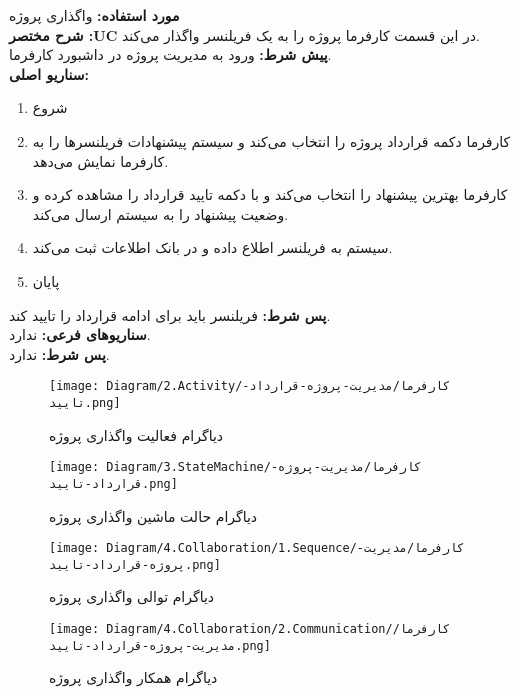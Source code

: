 \textbf{مورد استفاده:}
واگذاری پروژه
\\
\textbf{شرح مختصر :UC}
در این قسمت کارفرما پروژه را به یک فریلنسر واگذار می‌کند.
\\
\textbf{پيش شرط:}
ورود به مدیریت پروژه در داشبورد کارفرما.
\\
\textbf{سناريو اصلی:}
\begin{enumerate}
\item
شروع
\item
کارفرما دکمه قرارداد پروژه را انتخاب می‌کند و سیستم پیشنهادات فریلنسرها را به کارفرما نمایش می‌دهد.
\item
کارفرما بهترین پیشنهاد را انتخاب می‌کند و با دکمه تایید قرارداد را مشاهده کرده و وضعیت پیشنهاد را به سیستم ارسال می‌کند.
\item
سیستم به فریلنسر اطلاع داده و در بانک اطلاعات ثبت می‌کند.
\item
پایان
\end{enumerate}

\noindent
\textbf{پس شرط:}
فریلنسر باید برای ادامه قرارداد را تایید کند.
\\
\textbf{سناريوهای فرعی:}
ندارد.
\\
\textbf{پس شرط:}
ندارد.



\begin{figure}[H]
	\centering
	\texttt{[image: Diagram/2.Activity/کارفرما/مدیریت-پروژه-قرارداد-تایید.png]}
	\caption{دیاگرام فعالیت واگذاری پروژه}
	\label{fig:a:واگذاری-پروژه}
\end{figure}
\begin{figure}[H]
\centering
\texttt{[image: Diagram/3.StateMachine/کارفرما/مدیریت-پروژه-قرارداد-تایید.png]}
\caption{دیاگرام حالت ماشین واگذاری پروژه}
\label{fig:sm:واگذاری-پروژه}
\end{figure}
\begin{figure}[H]
	\centering
	\texttt{[image: Diagram/4.Collaboration/1.Sequence/کارفرما/مدیریت-پروژه-قرارداد-تایید.png]}
	\caption{دیاگرام توالی واگذاری پروژه}
	\label{fig:s:واگذاری-پروژه}
\end{figure}
\begin{figure}[H]
\centering
\texttt{[image: Diagram/4.Collaboration/2.Communication/کارفرما/مدیریت-پروژه-قرارداد-تایید.png]}
\caption{دیاگرام همکار واگذاری پروژه}
\label{fig:c:واگذاری-پروژه}
\end{figure}
